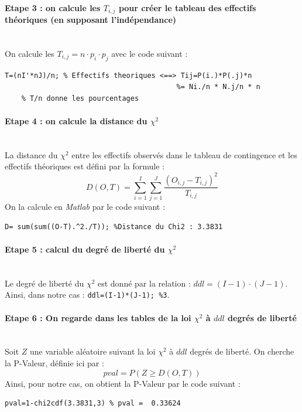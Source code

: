\documentclass[11pt]{article}
\begin{document}
 \paragraph{Etape 3 : on calcule les $T_{i,j}$ pour créer le tableau des effectifs théoriques (en supposant l'indépendance)}~\\\indent
 On calcule les $T_{i,j}=n\cdot p_i\cdot p_j$ avec le code suivant :
 \begin{lstlisting}[firstnumber=92,caption={Calcul des effectifs théoriques pour le test du $\chi^2$}]
    T=(nI'*nJ)/n; % Effectifs theoriques <==> Tij=P(i.)*P(.j)*n
                                         %= Ni./n * N.j/n * n
    % T/n donne les pourcentages
\end{lstlisting}

\paragraph{Etape 4 : on calcule la distance du $\chi^2$}~\\\indent
La distance du $\chi^2$ entre les effectifs observés dans le tableau de contingence et les effectifs théoriques est défini par la formule :
$$D(O,T)=\sum_{i=1}^{I}\sum_{j=1}^{J}\frac{\left(O_{i,j}-T_{i,j}\right)^2}{T_{i,j}} $$
On la calcule en \emph{Matlab} par le code suivant :
 \begin{lstlisting}[firstnumber=97,caption={Calcul de la distance du $\chi^2$}]
    D= sum(sum((O-T).^2./T)); %Distance du Chi2 : 3.3831
\end{lstlisting}

\paragraph{Etape 5 : calcul du degré de liberté du $\chi^2$}~\\\indent
Le degré de liberté du $\chi^2$ est donné par la relation : $ddl = (I-1)\cdot(J-1)$. Ainsi, dans notre cas : \lstinline{ddl=(I-1)*(J-1); %3}.

\paragraph{Etape 6 : On regarde dans les tables de la loi $\chi^2$ à $ddl$ degrés de liberté}~\\\indent
Soit $Z$ une variable aléatoire suivant la loi $\chi^2$ à $ddl$ degrés de liberté. On cherche la P-Valeur, définie ici par :
$$ pval=P(Z\geq D(O,T))$$
Ainsi, pour notre cas, on obtient la P-Valeur par le code suivant :
\begin{lstlisting}[firstnumber=103,caption={Calcul de la P-Valeur avec les tables de la loi de $\chi2$}]
pval=1-chi2cdf(3.3831,3) % pval =  0.33624
\end{lstlisting}
\end{document}
